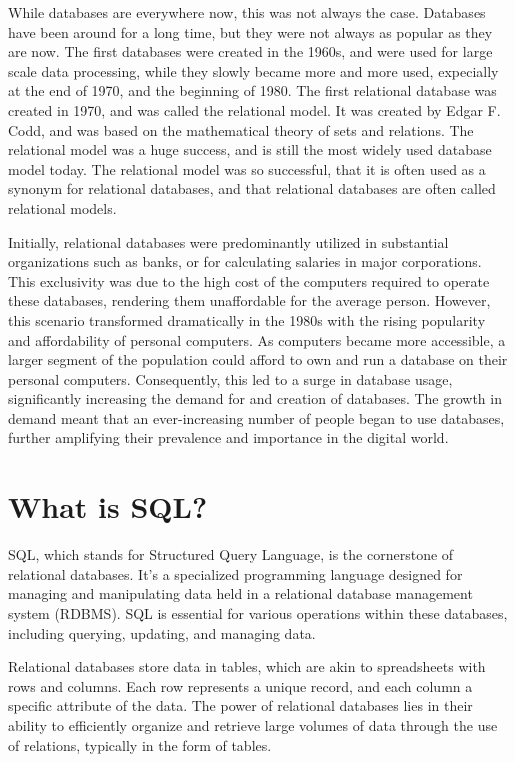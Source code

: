 While databases are everywhere now, this was not always the case. Databases have been around for a long time, but they were not always as popular as they are now. The first databases were created in the 1960s, and were used for large scale data processing, while they slowly became more and more used, expecially at the end of 1970, and the beginning of 1980. The first relational database was created in 1970, and was called the relational model. It was created by Edgar F. Codd, and was based on the mathematical theory of sets and relations. The relational model was a huge success, and is still the most widely used database model today. The relational model was so successful, that it is often used as a synonym for relational databases, and that relational databases are often called relational models.

Initially, relational databases were predominantly utilized in substantial organizations such as banks, or for calculating salaries in major corporations. This exclusivity was due to the high cost of the computers required to operate these databases, rendering them unaffordable for the average person. However, this scenario transformed dramatically in the 1980s with the rising popularity and affordability of personal computers. As computers became more accessible, a larger segment of the population could afford to own and run a database on their personal computers. Consequently, this led to a surge in database usage, significantly increasing the demand for and creation of databases. The growth in demand meant that an ever-increasing number of people began to use databases, further amplifying their prevalence and importance in the digital world.

\section{What is SQL?}
SQL, which stands for Structured Query Language, is the cornerstone of relational databases. It's a specialized programming language designed for managing and manipulating data held in a relational database management system (RDBMS). SQL is essential for various operations within these databases, including querying, updating, and managing data.

Relational databases store data in tables, which are akin to spreadsheets with rows and columns. Each row represents a unique record, and each column a specific attribute of the data. The power of relational databases lies in their ability to efficiently organize and retrieve large volumes of data through the use of relations, typically in the form of tables.

